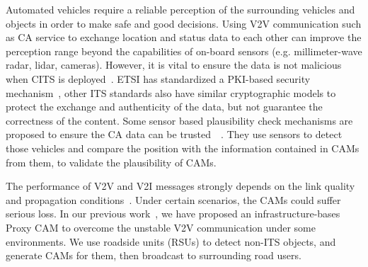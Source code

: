 Automated vehicles require a reliable perception of the surrounding vehicles and objects in order to make safe and good decisions.
Using V2V communication such as CA service to exchange location and status data to
each other can improve the perception range beyond the capabilities of on-board sensors (e.g. millimeter-wave radar, lidar, cameras).
However, it is vital to ensure the data is not malicious when CITS is deployed~\cite{amoozadeh2015security}.
ETSI has standardized a PKI-based security mechanism~\cite{etsi2013103},
other ITS standards also have similar cryptographic models to protect the exchange and authenticity of the data,
but not guarantee the correctness of the content.
Some sensor based plausibility check mechanisms are proposed to ensure the CA data can be trusted~\cite{obst2014multi}~\cite{dhurandher2014vehicular}.
They use sensors to detect those vehicles and compare the position with the information contained in CAMs from them, to validate the plausibility of CAMs.

The performance of V2V and V2I messages strongly depends on the link quality and propagation conditions~\cite{shagdar2012experimentation}.
Under certain scenarios, the CAMs could suffer serious loss.
In our previous work~\cite{kitazato2016proxy}, we have proposed an infrastructure-bases Proxy CAM to overcome the unstable V2V communication under some environments.
We use roadside units (RSUs) to detect non-ITS objects, and generate CAMs for them, then broadcast to surrounding road users.

